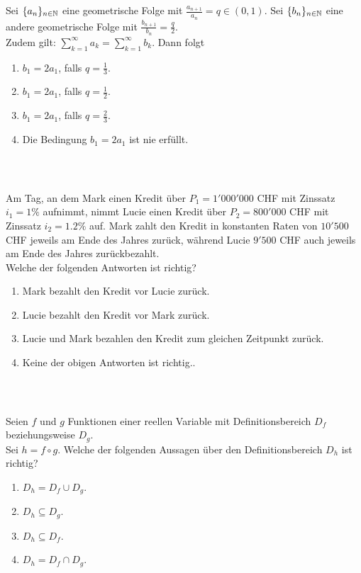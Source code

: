 \subsection*{}
Sei $ \{ a_n \}_{n \in \mathbb{N}} $ eine geometrische Folge mit 
$ \frac{a_{n+1}}{a_n} = q \in (0,1) $.
Sei $ \{ b_n \}_{n \in \mathbb{N}} $ eine andere geometrische Folge mit
$ \frac{b_{n+1}}{b_n} = \frac{q}{2} $.\\
Zudem gilt: $ \sum_{k = 1}^\infty a_k = \sum_{k = 1}^\infty b_k $.
Dann folgt
\renewcommand{\labelenumi}{(\alph{enumi})}
\begin{enumerate}
	\item 
	$ b_1 = 2 a_1 $, falls $ q = \frac{1}{3} $.
	\item
	$ b_1 = 2 a_1 $, falls $ q = \frac{1}{2} $.
	\item
	$ b_1 = 2 a_1 $, falls $ q = \frac{2}{3} $.
	\item
	Die Bedingung $ b_1 = 2 a_1 $ ist nie erfüllt.
\end{enumerate}
\ \\
\subsection*{}
Am Tag, an dem Mark einen Kredit über $ P_1= 1'000'000 $ CHF mit Zinssatz $ i_1 = 1 \% $ aufnimmt, nimmt Lucie einen Kredit über $ P_2= 800'000 $ CHF mit Zinssatz $ i_2 = 1.2 \% $ auf.
Mark zahlt den Kredit in konstanten Raten von $ 10'500 $ CHF jeweils am Ende des Jahres zurück, während Lucie $ 9'500 $ CHF auch jeweils am Ende des Jahres zurückbezahlt.\\
Welche der folgenden Antworten ist richtig?
\renewcommand{\labelenumi}{(\alph{enumi})}
\begin{enumerate}
	\item 
	Mark bezahlt den Kredit vor Lucie zurück.
	\item 
	Lucie bezahlt den Kredit vor Mark zurück.
	\item
	Lucie und Mark bezahlen den Kredit zum gleichen Zeitpunkt zurück.
	\item
	Keine der obigen Antworten ist richtig..
\end{enumerate}
\ \\
\subsection*{}
Seien $ f $ und $ g $ Funktionen einer reellen Variable mit Definitionsbereich $ D_f $ beziehungsweise $ D_g $.\\
Sei $ h = f \circ g $.
Welche der folgenden Aussagen über den Definitionsbereich $ D_h $ ist richtig?
\renewcommand{\labelenumi}{(\alph{enumi})}
\begin{enumerate}
	\item 
	$ D_h = D_f \cup D_g$.
	\item 
	$ D_h \subseteq D_g $.
	\item
	$ D_h \subseteq D_f $.
	\item
	$ D_h = D_f \cap  D_g $.
\end{enumerate}
\ \\
